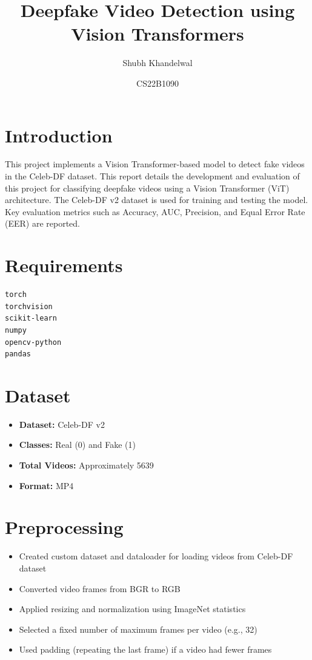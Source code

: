 \documentclass[11pt]{article}
\title{\textbf{Deepfake Video Detection using Vision Transformers}}
\author{Shubh Khandelwal}
\date{CS22B1090}
\begin{document}
\maketitle

\section{Introduction}
This project implements a Vision Transformer-based model to detect fake videos in the Celeb-DF dataset.
This report details the development and evaluation of this project for classifying deepfake videos using a Vision Transformer (ViT) architecture.
The Celeb-DF v2 dataset is used for training and testing the model.
Key evaluation metrics such as Accuracy, AUC, Precision, and Equal Error Rate (EER) are reported.

\section{Requirements}
\begin{lstlisting}
torch
torchvision
scikit-learn
numpy
opencv-python
pandas
\end{lstlisting}

\section{Dataset}
\begin{itemize}
    \item \textbf{Dataset:} Celeb-DF v2
    \item \textbf{Classes:} Real (0) and Fake (1)
    \item \textbf{Total Videos:} Approximately 5639
    \item \textbf{Format:} MP4
\end{itemize}

\section{Preprocessing}
\begin{itemize}
    \item Created custom dataset and dataloader for loading videos from Celeb-DF dataset
    \item Converted video frames from BGR to RGB
    \item Applied resizing and normalization using ImageNet statistics
    \item Selected a fixed number of maximum frames per video (e.g., 32)
    \item Used padding (repeating the last frame) if a video had fewer frames
\end{itemize}
\end{document}
